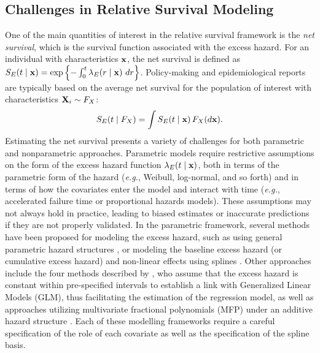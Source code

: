 \documentclass[12pt]{article}
\newcommand{\bfX}{{\bf X}}
\newcommand{\bfx}{{\bf x}}
\begin{document}


% 

\subsection{Challenges in Relative Survival Modeling}

One of the main quantities of interest in the relative survival framework is the \emph{net survival}, which is the survival function associated with the excess hazard. For an individual with characteristics $\bfx$, the net survival is defined as $S_E(t \mid \bfx) = \exp\left\{-\int_0^t \lambda_E( r \mid \bfx) \  dr\right\}$. Policy-making and epidemiological reports \citep{mariotto:2014,quaresma:2024} are typically based on the average net survival for the population of interest with characteristics $\bfX_i \sim F_X$:
\begin{equation*}
 S_E(t \mid F_X) = \int S_E(t \mid \bfx) \, F_X(d\bfx).
\end{equation*}
Estimating the net survival presents a variety of challenges for both parametric and nonparametric approaches. Parametric models require restrictive assumptions on the form of the excess hazard function $\lambda_E(t \mid \bfx)$, both in terms of the parametric form of the hazard (\textit{e.g.}, Weibull, log-normal, and so forth) and in terms of how the covariates enter the model and interact with time (\textit{e.g.}, accelerated failure time or proportional hazards models). These assumptions may not always hold in practice, leading to biased estimates or inaccurate predictions if they are not properly validated. In the parametric framework, several methods have been proposed for modeling the excess hazard, such as using general parametric hazard structures \citep{rubio:2019}, or modeling the baseline excess hazard (or cumulative excess hazard) and non-linear effects using splines \citep{giorgi:2003,dickman:2004,charvat:2021,fauvernier:2019,quaresma:2020,eletti:2022}. Other approaches include the four methods described by \cite{dickman:2004}, who assume that the excess hazard is constant within pre-specified intervals to establish a link with Generalized Linear Models (GLM), thus facilitating the estimation of the regression model, as well as approaches utilizing multivariate fractional polynomials (MFP) under an additive hazard structure \citep{lambert:2005}. Each of these modelling frameworks require a careful specification of the role of each covariate as well as the specification of the spline basis.
\end{document}
